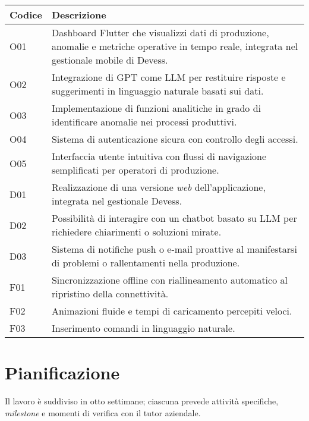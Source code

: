 \begin{center}
\brandTableColors
\begin{longtable}{|p{2.25cm}|p{12.00cm}|}
  \hline
  \textbf{Codice} & \textbf{Descrizione} \\ \hline
  \endhead
  \rowcolors{1}{tableRowA}{tableRowB}

  O01 & Dashboard Flutter che visualizzi dati di produzione, anomalie e metriche operative in tempo reale, integrata nel gestionale mobile di Devess. \\ \hline
  O02 & Integrazione di GPT come \gls{LLM} per restituire risposte e suggerimenti in linguaggio naturale basati sui dati. \\ \hline
  O03 & Implementazione di funzioni analitiche in grado di identificare anomalie nei processi produttivi. \\ \hline
  O04 & Sistema di autenticazione sicura con controllo degli accessi. \\ \hline
  O05 & Interfaccia utente intuitiva con flussi di navigazione semplificati per operatori di produzione. \\ \hline
  D01 & Realizzazione di una versione \textit{web} dell'applicazione, integrata nel gestionale Devess. \\ \hline
  D02 & Possibilità di interagire con un chatbot basato su \gls{LLM} per richiedere chiarimenti o soluzioni mirate. \\ \hline
  D03 & Sistema di notifiche push o e-mail proattive al manifestarsi di problemi o rallentamenti nella produzione. \\ \hline
  F01 & Sincronizzazione offline con riallineamento automatico al ripristino della connettività. \\ \hline
  F02 & Animazioni fluide e tempi di caricamento percepiti veloci. \\ \hline
  F03 & Inserimento comandi in linguaggio naturale. \\ \hline
\end{longtable}
\label{tab:requisiti_obbiettivi}
\end{center}



\section{Pianificazione}
\label{subsec:pianificazione}

Il lavoro è suddiviso in otto settimane; ciascuna prevede attività specifiche, \textit{milestone} e momenti di verifica con il tutor aziendale.

